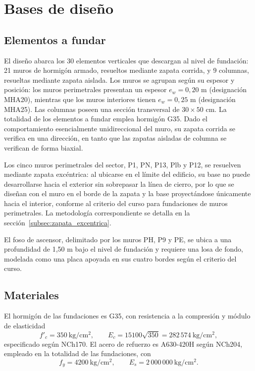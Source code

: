 \section{Bases de diseño}

\subsection{Elementos a fundar}

El diseño abarca los 30 elementos verticales que descargan al nivel de fundación: 21 muros de hormigón armado, resueltos mediante zapata corrida, y 9 columnas, resueltas mediante zapata aislada. Los muros se agrupan según su espesor y posición: los muros perimetrales presentan un espesor $e_w = 0,20$ m (designación MHA20), mientras que los muros interiores tienen $e_w = 0,25$ m (designación MHA25). Las columnas poseen una sección transversal de $30 \times 50$ cm. La totalidad de los elementos a fundar emplea hormigón G35. Dado el comportamiento esencialmente unidireccional del muro, su zapata corrida se verifica en una dirección, en tanto que las zapatas aisladas de columna se verifican de forma biaxial.

Los cinco muros perimetrales del sector, P1, PN, P13, Plb y P12, se resuelven mediante zapata excéntrica: al ubicarse en el límite del edificio, su base no puede desarrollarse hacia el exterior sin sobrepasar la línea de cierro, por lo que se diseñan con el muro en el borde de la zapata y la base proyectándose únicamente hacia el interior, conforme al criterio del curso para fundaciones de muros perimetrales. La metodología correspondiente se detalla en la sección~\ref{subsec:zapata_excentrica}.

El foso de ascensor, delimitado por los muros PH, P9 y PE, se ubica a una profundidad de 1,50 m bajo el nivel de fundación y requiere una losa de fondo, modelada como una placa apoyada en sus cuatro bordes según el criterio del curso.

\subsection{Materiales}
El hormigón de las fundaciones es G35, con resistencia a la compresión y módulo de elasticidad
\begin{equation}
f'_c = 350~\mathrm{kg/cm^2}, \qquad E_c = 15100\sqrt{350} = 282\,574~\mathrm{kg/cm^2},
\end{equation}
especificado según NCh170. El acero de refuerzo es A630-420H según NCh204, empleado en la totalidad de las fundaciones, con
\begin{equation}
f_y = 4200~\mathrm{kg/cm^2}, \qquad E_s = 2\,000\,000~\mathrm{kg/cm^2}.
\end{equation}

